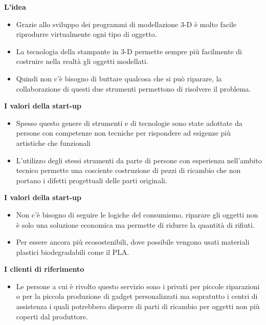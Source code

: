 \documentclass[hidelinks,aspectratio=169]{beamer}
\makeatletter
\newcounter{z@@m}
\newcommand{\zoombox}[2][0]{%
	\leavevmode%
	\sbox\zb@x{#2}%
	\setlength\B@r{1pt*\ratio{\wd\zb@x}{\ht\zb@x+\dp\zb@x}}%
	\setlength\P@r{1pt*\ratio{\paperwidth}{\paperheight}}%
	\ifdim\B@r>\P@r\relax%
	\setlength\@zw{\wd\zb@x}\setlength\@zh{\@zw*\ratio{\paperheight}{\paperwidth}}%
	\setlength\@zd{(\@zh-\ht\zb@x-\dp\zb@x)*\real{0.5}+\dp\zb@x}%
	\setlength\@zh{\@zh-\@zd}%
	\else%
	\setlength\@zh{\ht\zb@x+\dp\zb@x}%
	\setlength\@zw{\@zh*\ratio{\paperwidth}{\paperheight}}%
	\setlength\@zh{\ht\zb@x}\setlength\@zd{\dp\zb@x}%
	\fi%
	\makebox[0pt][l]{\makebox[\wd\zb@x][c]{\makebox[\@zw][l]{%
				\pdfdest name {zbfs\thez@@m} fitr
				width  \@zw\space
				height \@zh\space
				depth  \@zd\space
	}}}%
	\pdfdest name {zb\thez@@m} fitr
	width  \wd\zb@x\space
	height \ht\zb@x\space
	depth  \dp\zb@x\space
	\immediate\pdfannot 
	width  \wd\zb@x\space
	height \ht\zb@x\space
	depth  \dp\zb@x\space
	{%
		/Subtype/Link/H/N
		/Border [0 0 #1 [1 2]]
		/A <<
		/S/JavaScript
		/JS (
		if(typeof(zoomed)=='undefined'||!zoomed){
			var lastView=this.viewState;
			if(app.fs.isFullScreen) this.gotoNamedDest('zbfs\thez@@m');
			else this.gotoNamedDest('zb\thez@@m');
			zoomed=true;
		}else{
			this.viewState=lastView;
			zoomed=false;
		}
		)
		>>
	}%
	\usebox{\zb@x}%
	\stepcounter{z@@m}%
}
\makeatother
\begin{document}
\begin{frame}
	\end{frame}
	
	\begin{frame}{\textbf{L'idea}}
		\begin{itemize}
			\item Grazie allo sviluppo dei programmi di modellazione 3-D è molto facile riprodurre virtualmente ogni tipo di oggetto.
			\item La tecnologia della stampante in 3-D permette sempre più facilmente di costruire nella realtà gli oggetti modellati.
			\item Quindi non c'è bisogno di buttare qualcosa che si può riparare, la collaborazione di questi due strumenti permettono di risolvere il problema.
		\end{itemize}
	\end{frame}
	
	\begin{frame}{\textbf{I valori della start-up}}
		\begin{itemize}
			\item Spesso questo genere di strumenti e di tecnologie sono state adottate da persone con competenze non tecniche per rispondere ad esigenze più artistiche che funzionali
			\item L'utilizzo degli stessi strumenti da parte di persone con esperienza nell'ambito tecnico permette una cosciente costruzione di pezzi di ricambio che non portano i difetti progettuali delle parti originali.
		\end{itemize}
	\end{frame}
	
	\begin{frame}{\textbf{I valori della start-up}}
		\begin{itemize}
			\item Non c'è bisogno di seguire le logiche del consumismo, riparare gli oggetti non è solo una soluzione economica ma permette di ridurre la quantità di rifiuti. 
			\item Per essere ancora più ecosostenibili, dove possibile vengono usati materiali plastici biodegradabili come il PLA.
		\end{itemize} 
	\end{frame}
	
	\begin{frame}{\textbf{I clienti di riferimento}}
		\begin{itemize}
			\item Le persone a cui è rivolto questo servizio sono i privati per piccole riparazioni o per la piccola produzione di gadget personalizzati ma sopratutto i centri di assistenza i quali potrebbero disporre di parti di ricambio per oggetti non più coperti dal produttore.
		\end{itemize}
	\end{frame}
	
\end{document}
